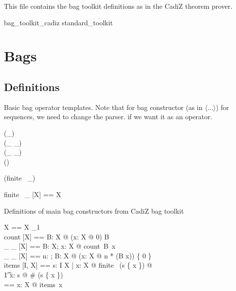 \documentclass[draft,a4paper,10pt,wd]{article}
\begin{document}
This file contains the bag toolkit definitions as in the CadiZ
theorem prover. 

\begin{zsection}
\SECTION bag\_toolkit\_cadiz \parents standard\_toolkit
\end{zsection}

\section{Bags }\label{def-bag}

\subsection*{Definitions}

Basic bag operator templates. Note that for bag constructor
(as in $\langle ... \rangle$) for sequences, we need to change
the parser. if we want it as an operator.




\begin{zed}
    \generic (\bag \_) \\
     \leftassoc (\_ \bcount \_) \\
     \leftassoc (\_ \otimes \_) \\
    \function (\lbag \listarg \rbag) \\
\end{zed}

\begin{zed}
    \relation (finite~ \_) 
\end{zed}

\begin{zed}
    finite~ \_ [X] == \finset X
\end{zed}

Definitions of main bag constructors from CadiZ bag toolkit

\begin{zed}
    \bag X == X \pfun \nat_1 \\
    count [X] == \lambda B: \bag X @ (\lambda x: X @ 0) \oplus B \\
    \_ \bcount \_ [X] == \lambda B: \bag X; x: X @ count~B~x \\
    \_ \otimes \_ [X] == \lambda n: \nat; B: \bag X @ (\lambda x: X @ n * (B \bcount x)) \nrres \{ 0 \} \\
    items [I, X] == \lambda s: I \rel X | \forall x: X @ finite~ (s \rres \{ x \}) @ \\
                              \t1 \lambda x: \ran s @ \# (s \rres \{ x \})  \\
    \lbag \listarg \rbag [X] == \lambda x: \seq X @ items~x
\end{zed}
\end{document}
